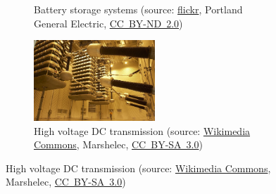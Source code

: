 \begin{frame}[c]
\begin{figure}
\begin{subfigure}[b]{0.49\textwidth}
			\caption{Battery storage systems (source: \href{https://www.flickr.com/photos/portlandgeneralelectric/8905201835}{flickr}, 
			Portland General Electric, \href{https://creativecommons.org/licenses/by-nd/2.0/}{CC~BY-ND~2.0})}
		\end{subfigure}
		\hfill
		\begin{subfigure}[b]{0.49\textwidth}
			\centering
			\includegraphics[width=0.5\textwidth]{fig/lec01/HVDC.jpg}
			\caption{High voltage DC transmission (source: \href{https://commons.wikimedia.org/wiki/File:Pole_2_Thyristor_Valve.jpg}{Wikimedia Commons},  	 	Marshelec, \href{https://creativecommons.org/licenses/by-sa/3.0/deed.en}{CC~BY-SA~3.0})}
		\end{subfigure}
	\end{figure}
\end{frame}

